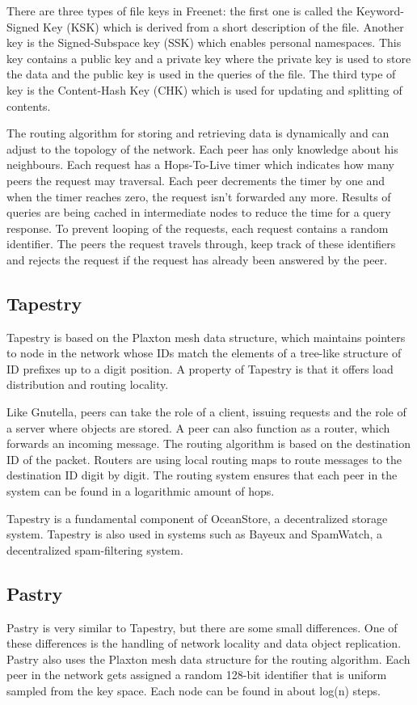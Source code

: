 \documentclass{article}
\begin{document}
		There are three types of file keys in Freenet: the first one is called the Keyword-Signed Key (KSK) which is derived from a short description of the file. Another key is the Signed-Subspace key (SSK) which enables personal namespaces. This key contains a public key and a private key where the private key is used to store the data and the public key is used in the queries of the file. The third type of key is the Content-Hash Key (CHK) which is used for updating and splitting of contents.
		
		The routing algorithm for storing and retrieving data is dynamically and can adjust to the topology of the network. Each peer has only knowledge about his neighbours. Each request has a Hops-To-Live timer which indicates how many peers the request may traversal. Each peer decrements the timer by one and when the timer reaches zero, the request isn't forwarded any more. Results of queries are being cached in intermediate nodes to reduce the time for a query response. To prevent looping of the requests, each request contains a random identifier. The peers the request travels through, keep track of these identifiers and rejects the request if the request has already been answered by the peer.
		
	\subsection{Tapestry} %
		Tapestry is based on the Plaxton mesh data structure, which maintains pointers to node in the network whose IDs match the elements of a tree-like structure of ID prefixes up to a digit position. A property of Tapestry is that it offers load distribution and routing locality.
		
		Like Gnutella, peers can take the role of a client, issuing requests and the role of a server where objects are stored. A peer can also function as a router, which forwards an incoming message. The routing algorithm is based on the destination ID of the packet. Routers are using local routing maps to route messages to the destination ID digit by digit. The routing system ensures that each peer in the system can be found in a logarithmic amount of hops.
		
		Tapestry is a fundamental component of OceanStore, a decentralized storage system. Tapestry is also used in systems such as Bayeux and SpamWatch, a decentralized spam-filtering system.

	\subsection{Pastry} %
		Pastry is very similar to Tapestry, but there are some small differences. One of these differences is the handling of network locality and data object replication. Pastry also uses the Plaxton mesh data structure for the routing algorithm. Each peer in the network gets assigned a random 128-bit identifier that is uniform sampled from the key space. Each node can be found in about log(n) steps.
\end{document}
